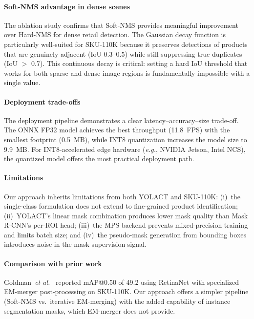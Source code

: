 \documentclass[conference]{IEEEtran}
\newcommand{\eg}{\emph{e.g.}}
\newcommand{\etal}{\emph{et al.}}
\begin{document}
\paragraph{Soft-NMS advantage in dense scenes}
The ablation study confirms that Soft-NMS provides meaningful improvement
over Hard-NMS for dense retail detection. The Gaussian decay function
is particularly well-suited for SKU-110K because it preserves detections
of products that are genuinely adjacent (IoU 0.3--0.5) while still
suppressing true duplicates (IoU $>$ 0.7). This continuous decay is
critical: setting a hard IoU threshold that works for both sparse and
dense image regions is fundamentally impossible with a single value.

\paragraph{Deployment trade-offs}
The deployment pipeline demonstrates a clear latency--accuracy--size
trade-off. The ONNX FP32 model achieves the best throughput (11.8~FPS)
with the smallest footprint (0.5~MB), while INT8 quantization increases
the model size to 9.9~MB. For INT8-accelerated edge hardware (\eg,
NVIDIA Jetson, Intel NCS), the quantized model offers the most
practical deployment path.

\paragraph{Limitations}
Our approach inherits limitations from both YOLACT and SKU-110K:
(i)~the single-class formulation does not extend to fine-grained
product identification; (ii)~YOLACT's linear mask combination
produces lower mask quality than Mask R-CNN's per-ROI head;
(iii)~the MPS backend prevents mixed-precision training and limits
batch size; and (iv)~the pseudo-mask generation from bounding boxes
introduces noise in the mask supervision signal.

\paragraph{Comparison with prior work}
Goldman~\etal~\cite{goldman2019dense} reported mAP@0.50 of 49.2 using
RetinaNet with specialized EM-merger post-processing on SKU-110K.
Our approach offers a simpler pipeline (Soft-NMS vs.\ iterative
EM-merging) with the added capability of instance segmentation
masks, which EM-merger does not provide.

\end{document}
